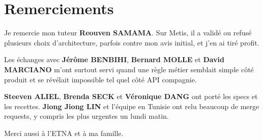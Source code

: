 \chapter*{Remerciements}

Je remercie mon tuteur \textbf{Reouven SAMAMA}. Sur Metis, il a validé ou refusé plusieurs choix d'architecture, parfois contre mon avis initial, et j'en ai tiré profit.

Les échanges avec \textbf{Jérôme BENBIHI}, \textbf{Bernard MOLLE} et \textbf{David MARCIANO} m'ont surtout servi quand une règle métier semblait simple côté produit et se révélait impossible tel quel côté API compagnie.

\textbf{Steeven ALIEL}, \textbf{Brenda SECK} et \textbf{Véronique DANG} ont porté les specs et les recettes. \textbf{Jiong Jiong LIN} et l'équipe en Tunisie ont relu beaucoup de merge requests, y compris les plus urgentes un lundi matin.

Merci aussi à l'ETNA et à ma famille.

\newpage
